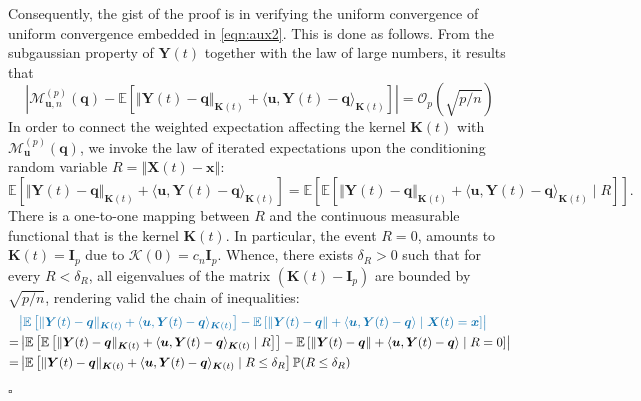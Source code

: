 \documentclass[aos]{imsart}
\theoremstyle{plain}
\theoremstyle{remark}
\def\E{\mathbb{E}}
\newcommand{\Mcal}{\mathcal{M}}
\newcommand{\Kcal}{\mathcal{K}}
\newcommand{\bb}[1]{\boldsymbol{#1}}
\newcommand{\prob}{\mathbb{P}}
\newcommand{\sredit}[1]{ {\color{myblue}{#1}} }
\newcommand{\cnam}[1]{\textcolor{mypurple}{#1}}
\newenvironment{pfofThm}{\noindent{\bf Proof of Theorem}}{\hfill $\square$ \\}
\begin{document}
\begin{pfofThm}
    Consequently, the gist of the proof is in verifying the \cnam{uniform convergence of uniform convergence embedded in \eqref{eqn:aux2}}. This is done as follows. From the subgaussian property of $\bb{Y}(t)$ together with the law of large numbers, it results that 
    \begin{equation}
        \left\vert \Mcal_{\bb{u},n}^{(p)}(\bb{q}) - \E\left[ \Vert \bb{Y}(t) - \bb{q} \Vert_{\bb{K}(t)} + \langle \bb{u}, \bb{Y}(t) - \bb{q} \rangle_{\bb{K}(t)} \right] \right\vert = \mathcal{O}_p(\sqrt{p/n})
        \label{eqn:step-mcaln-mcalkern}
    \end{equation}
  In order to connect the weighted expectation affecting the kernel $\bb{K}(t)$ with $\Mcal_{\bb{u}}^{(p)}(\bb{q})$, we invoke the law of iterated expectations upon the conditioning random variable $R = \left\Vert \bb{X}(t) - \bb{x} \right\Vert$: 
    \begin{equation*}
        \E\left[ \Vert \bb{Y}(t) - \bb{q} \Vert_{\bb{K}(t)} + \langle \bb{u}, \bb{Y}(t) - \bb{q} \rangle_{\bb{K}(t)} \right]
        = \E\left[ \E\left[ \Vert \bb{Y}(t) - \bb{q} \Vert_{\bb{K}(t)} + \langle \bb{u}, \bb{Y}(t) - \bb{q} \rangle_{\bb{K}(t)} \mid R \right] \right].
    \end{equation*}
\cnam{There is a one-to-one mapping between $R$ and the continuous measurable functional that is the kernel $\bb{K}(t)$. In particular, the event $R = 0$, amounts to $\bb{K}(t) = \bb{I}_p$ due to $\Kcal(0) = c_n\bb{I}_p$. Whence, there exists $\delta_R > 0$ such that for every $R < \delta_R$, all eigenvalues of the matrix $(\bb{K}(t) - \bb{I}_p)$ are bounded by $\sqrt{p/n}$, rendering valid the chain of inequalities:}
    \begin{align*}
        & \sredit{\left\vert \E\left[ \Vert \bb{Y}(t) - \bb{q} \Vert_{\bb{K}(t)} + \langle \bb{u}, \bb{Y}(t) - \bb{q} \rangle_{\bb{K}(t)} \right] - \E\left[ \Vert \bb{Y}(t) - \bb{q} \Vert + \langle \bb{u}, \bb{Y}(t) - \bb{q} \rangle \mid \bb{X}(t) = \bb{x} \right] \right\vert}\\
        = & \left\vert \E\left[ \E\left[ \Vert \bb{Y}(t) - \bb{q} \Vert_{\bb{K}(t)} + \langle \bb{u}, \bb{Y}(t) - \bb{q} \rangle_{\bb{K}(t)} \mid R \right] \right] - \E\left[ \Vert \bb{Y}(t) - \bb{q} \Vert + \langle \bb{u}, \bb{Y}(t) - \bb{q} \rangle \mid R = 0 \right] \right\vert \\
        = & \left\vert  \E\left[ \Vert \bb{Y}(t) - \bb{q} \Vert_{\bb{K}(t)} + \langle \bb{u}, \bb{Y}(t) - \bb{q} \rangle_{\bb{K}(t)} \mid R \leq \delta_R \right]\prob(R \leq \delta_R) \right. \\

\end{align*}
\end{pfofThm}
\end{document}
